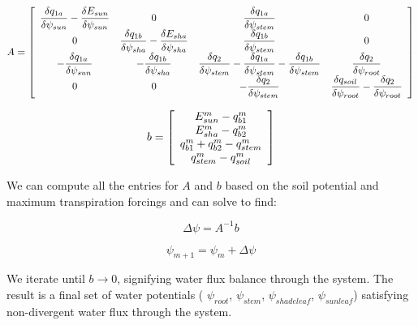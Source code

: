 \documentclass[draft,linenumbers]{agujournal}
\begin{document}
   \begin{linenomath*} \begin{equation} 
   A=
   \left[ \begin {array}{cccc}
   \dfrac{\delta q_{1a}}{\delta \psi_{sun}}-\dfrac{\delta E_{sun}}{\delta \psi_{sun}}&0&\dfrac{\delta q_{1a}}{\delta \psi_{stem}}&0\cr
   0&\dfrac{\delta q_{1b}}{\delta \psi_{sha}}-\dfrac{\delta E_{sha}}{\delta \psi_{sha}}&\dfrac{\delta q_{1b}}{\delta \psi_{stem}}&0\cr
   -\dfrac{\delta q_{1a}}{\delta \psi_{sun}}&
   -\dfrac{\delta q_{1b}}{\delta \psi_{sha}}&
   \dfrac{\delta q_2}{\delta \psi_{stem}}-\dfrac{\delta q_{1a}}{\delta \psi_{stem}}-\dfrac{\delta q_{1b}}{\delta \psi_{stem}}&
   \dfrac{\delta q_2}{\delta \psi_{root}}\cr
   0&0&-\dfrac{\delta q_2}{\delta \psi_{stem}}&\dfrac{\delta q_{soil}}{\delta \psi_{root}}-\dfrac{\delta q_2}{\delta \psi_{root}}
   \end {array} \right]
   \end{equation} \end{linenomath*}

   \begin{linenomath*} \begin{equation} 
   b=
   \left[ \begin {array}{c}
   E_{sun}^{m}-q_{b1}^{m} \cr
   E_{sha}^{m}-q_{b2}^{m} \cr
   q_{b1}^{m}+q_{b2}^{m}-q_{stem}^{m} \cr
   q_{stem}^{m}-q_{soil}^{m}
   \end {array} \right]
   \end{equation} \end{linenomath*}

We can compute all the entries for $A$ and $b$ based on the soil potential and maximum transpiration forcings and can solve to find:

   \begin{linenomath*} \begin{equation} 
   \Delta\psi=A^{-1}b
   \end{equation} \end{linenomath*}

   \begin{linenomath*} \begin{equation} 
   \psi_{m+1}=\psi_m+\Delta\psi
   \end{equation} \end{linenomath*}

We iterate until $b\to 0$, signifying water flux balance through the system. The result is a final set of water potentials ( $\psi_{root}$, $\psi_{stem}$, $\psi_{shadeleaf}$, $\psi_{sunleaf}$) satisfying non-divergent water flux through the system. 
\end{document}
